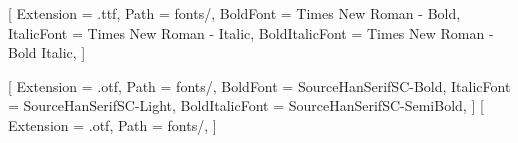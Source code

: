 \usepackage{fontspec}

\setmainfont{Times New Roman}[
  Extension = .ttf,
  Path            = fonts/,
  BoldFont        = Times New Roman - Bold,
  ItalicFont      = Times New Roman - Italic,
  BoldItalicFont  = Times New Roman - Bold Italic,
]

\usepackage{xeCJK}
[
  Extension       = .otf,
  Path            = fonts/,
  BoldFont        = SourceHanSerifSC-Bold,
  ItalicFont      = SourceHanSerifSC-Light,
  BoldItalicFont  = SourceHanSerifSC-SemiBold,
]
[
  Extension   = .otf,
  Path        = fonts/,
]

